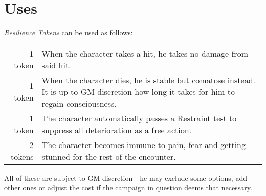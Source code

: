 \documentclass[12pt,a4paper,openany,usenames,dvipsnames]{book}
\begin{document}
	\section{Uses}
	\emph{Resilience Tokens} can be used as follows:
	\par
	\begin{tabularx}{\columnwidth}{rX}
		1 token & When the character takes a hit, he takes no damage from said hit. \\
		1 token & When the character dies, he is stable but comatose instead. It is up to GM discretion how long it takes for him to regain consciousness. \\
		1 token & The character automatically passes a Restraint test to suppress all deterioration as a free action. \\
		2 tokens & The character becomes immune to pain, fear and getting stunned for the rest of the encounter.
	\end{tabularx}
	\par
	All of these are subject to GM discretion - he may exclude some options, add other ones or adjust the cost if the campaign in question deems that necessary.
\end{document}
